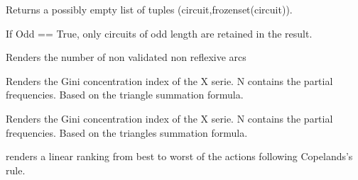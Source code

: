\documentclass[letterpaper,10pt,english]{sphinxmanual}
\begin{document}
\begin{fulllineitems}
\begin{fulllineitems}
Returns a possibly empty list of tuples (circuit,frozenset(circuit)).

If Odd == True, only circuits of odd length are retained in the result.

\end{fulllineitems}


\begin{fulllineitems}
\label{techDoc:digraphs.Digraph.computeCoSize}
Renders the number of non validated non reflexive arcs

\end{fulllineitems}


\begin{fulllineitems}
\label{techDoc:digraphs.Digraph.computeConcentrationIndex}
Renders the Gini concentration index of the X serie.
N contains the partial frequencies.
Based on the triangle summation formula.

\end{fulllineitems}


\begin{fulllineitems}
\label{techDoc:digraphs.Digraph.computeConcentrationIndexTrapez}
Renders the Gini concentration index of the X serie.
N contains the partial frequencies.
Based on the triangles summation formula.

\end{fulllineitems}


\begin{fulllineitems}
\label{techDoc:digraphs.Digraph.computeCopelandRanking}
renders a linear ranking from best to worst of the actions
following Copelands's rule.

\end{fulllineitems}



\end{fulllineitems}
\end{document}
